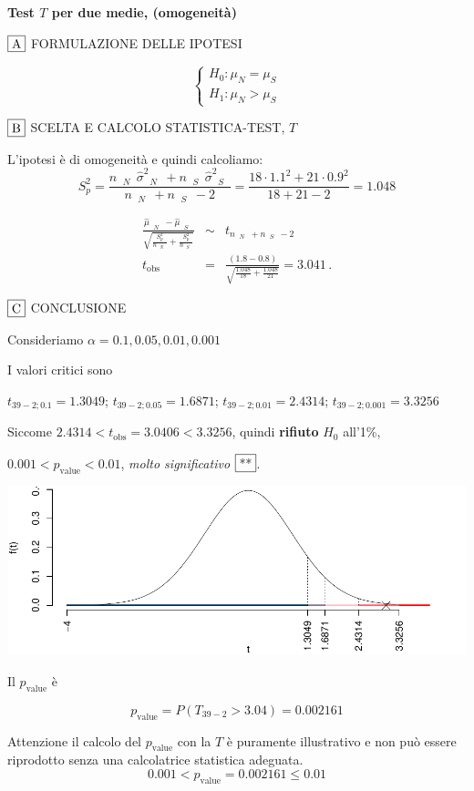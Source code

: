\documentclass[
  11pt,
]{book}
\theoremstyle{mytheoremstyle}
\theoremstyle{mydefstyle}
\newenvironment{sol}
  {
  \begin{tcolorbox}[enhanced,breakable,arc=0.1mm,boxrule=1pt,colback=white,colframe=iblue,
  title=\bf \fontfamily{lmss}\selectfont \hspace{.5 cm} Soluzione,drop fuzzy shadow]

}{
\end{tcolorbox}
  }
\begin{document}
\begin{sol}
\textbf{Test \(T\) per due medie, (omogeneità)}

\(\fbox{A}\) FORMULAZIONE DELLE IPOTESI

\[\begin{cases}
   H_0: \mu_\text{$N$} = \mu_\text{$S$} \\
   H_1: \mu_\text{$N$} > \mu_\text{$S$} 
   \end{cases}\]

\(\fbox{B}\) SCELTA E CALCOLO STATISTICA-TEST, \(T\)

L'ipotesi è di omogeneità e quindi calcoliamo:\[
   S_p^2=\frac{n_\text{ $N$ }\hat\sigma^2_\text{ $N$ }+n_\text{ $S$ }\hat\sigma^2_\text{ $S$ }}{n_\text{ $N$ }+n_\text{ $S$ }-2} =
   \frac{ 18 \cdot 1.1 ^2+ 21 \cdot 0.9 ^2}{ 18 + 21 -2}= 1.048 
  \]

\begin{eqnarray*}
  \frac{\hat\mu_\text{ $N$ } - \hat\mu_\text{ $S$ }}
  {\sqrt{\frac {S^2_p}{n_\text{ $N$ }}+\frac {S^2_p}{n_\text{ $S$ }}}}&\sim&t_{n_\text{ $N$ }+n_\text{ $S$ }-2}\\
  t_{\text{obs}}
  &=& \frac{ ( 1.8 -  0.8 )} {\sqrt{\frac{ 1.048 }{ 18 }+\frac{ 1.048 }{ 21 }}}
  =   3.041 \, .
  \end{eqnarray*}

\(\fbox{C}\) CONCLUSIONE

Consideriamo \(\alpha=0.1, 0.05, 0.01, 0.001\)

I valori critici sono

\(t_{39-2;0.1}=1.3049\); \(t_{39-2;0.05}=1.6871\); \(t_{39-2;0.01}=2.4314\); \(t_{39-2;0.001}=3.3256\)

Siccome \(2.4314<t_\text{obs}=3.0406<3.3256\), quindi \textbf{rifiuto} \(H_0\) all'1\%,

\(0.001<p_\text{value}<0.01\), \emph{molto significativo} \(\fbox{**}\).

\begin{center}\includegraphics{Esami_passati_con_soluzioni_files/figure-latex/2024-102-1} \end{center}

Il \(p_{\text{value}}\) è

\[ p_{\text{value}} = P(T_{39-2}>3.04)=0.002161 \]

Attenzione il calcolo del \(p_\text{value}\) con la \(T\) è puramente illustrativo e non può essere riprodotto senza una calcolatrice statistica adeguata.\[
 0.001 < p_\text{value}= 0.002161 \leq 0.01 
\]

\end{sol}
\end{document}
